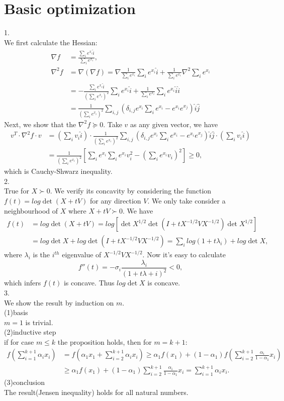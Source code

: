 \documentclass{article}
\begin{document}
\section{Basic optimization}
1.\\
We first calculate the Hessian:
\begin{align*}
\nabla f &= \frac{\sum_i e^{x_i}\hat{i}}{\sum_i e^{x_i}},\\
\nabla^2 f &= \nabla (\nabla f) = \nabla\frac{1}{\sum_i e^{x_i}} \sum_i e^{x_i}\hat{i} + \frac{1}{\sum_i e^{x_i}}\nabla^2\sum_i e^{x_i}\\
&=-\frac{\sum_i e^{x_i}\hat{i}}{(\sum_i e^{x_i})^2} \sum_i e^{x_i}\hat{i} + \frac{1}{\sum_i e^{x_i}}\sum_ie^{x_i}\hat{i}\hat{i}\\
&=\frac{1}{(\sum_i e^{x_i})^2}\sum_{i,j}(\delta_{i,j}e^{x_i}\sum_i e^{x_i}-e^{x_i}e^{x_j})\hat{i}\hat{j}
\end{align*}
Next, we show that the $\nabla^2f\succeq 0$. Take $v$ as any given vector, we have
\begin{align*}
v^T\cdot\nabla^2f\cdot v&=(\sum_iv_i\hat{i})\cdot\frac{1}{(\sum_i e^{x_i})^2}\sum_{i,j}(\delta_{i,j}e^{x_i}\sum_i e^{x_i}-e^{x_i}e^{x_j})\hat{i}\hat{j}\cdot(\sum_iv_i\hat{i})\\
&=\frac{1}{(\sum_i e^{x_i})^2}[\sum_ie^{x_i}\sum_ie^{x_i}v_i^2-(\sum_ie^{x_i}v_i)^2]\geq 0,
\end{align*}
which is Cauchy-Shwarz inequality.\\
2.\\
True for $X\succ0$. We verify its concavity by considering the function $f(t)=log \det(X+tV)$ for any direction $V$. We only take consider a neighbourhood of $X$ where $X+tV\succ0$. We have
\begin{align*}
f(t) &= log \det(X+tV) = log[\det X^{1/2}\det (I+tX^{-1/2}VX^{-1/2})\det X^{1/2}]\\
&=log\det X+log\det(I+tX^{-1/2}VX^{-1/2})=\sum_ilog(1+t\lambda_i) + log\det X,
\end{align*}
where $\lambda_i$ is the $i^{th}$ eigenvalue of $X^{-1/2}VX^{-1/2}$. Now it's easy to calculate
$$f''(t)=-\sigma_i\frac{\lambda_i}{(1+t\lambda+i)^2}<0,$$
which infers $f(t)$ is concave. Thus $log\det X$ is concave.\\
3.\\
We show the result by induction on $m$.\\
(1)basis\\
$m = 1$ is trivial.\\
(2)inductive step\\
if for case $m	\leq k$ the proposition holds, then for $m=k+1$:
\begin{align*}
f(\sum_{i=1}^{k+1}\alpha_ix_i)&=f(\alpha_1x_1+\sum_{i=2}^{k+1}\alpha_ix_i)\geq\alpha_1f(x_1)+(1-\alpha_1)f(\sum_{i=2}^{k+1}\frac{\alpha_i}{1-\alpha_1}x_i)\\
& \geq \alpha_1f(x_1) + (1-\alpha_1)\sum_{i=2}^{k+1}\frac{\alpha_i}{1-\alpha_1}x_i=\sum_{i=1}^{k+1}\alpha_ix_i.
\end{align*}
(3)conclusion\\
The result(Jensen inequality) holds for all natural numbers.
\end{document}
